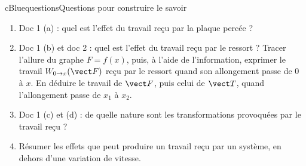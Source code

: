 \begin{rub}{cBlue}{questions}{Questions pour construire le savoir}
\begin{enumerate}
  \item {} Doc 1 (a) : quel est l’effet du travail reçu par la plaque percée ?
  \item {} Doc 1 (b) et doc 2 : quel est l’effet du travail reçu par le ressort ? Tracer l’allure du graphe $F = f(x)$, puis, à l’aide de l’information, exprimer le travail $W_{0\to x}(\vect F)$ reçu par le ressort quand son allongement passe de 0 à $x$. En déduire le travail de $\vect F$, puis celui de $\vect T$, quand l’allongement passe de $x_1$ à $x_2$.
  \item {} Doc 1 (c) et (d) : de quelle nature sont les transformations provoquées par le travail reçu ?
  \item {} Résumer les effets que peut produire un travail reçu par un système, en dehors d’une variation de vitesse.
\end{enumerate}
\end{rub}

